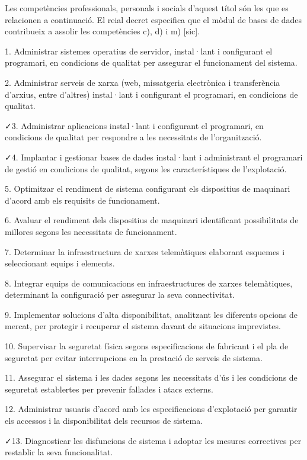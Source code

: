 \documentclass[catalan, a4paper, 12pt, titlepage]{article}
\begin{document}
Les competències professionals, personals i socials d'aquest títol són les que es relacionen a continuació. 
El reial decret especifica que el mòdul de bases de dades contribueix a assolir les competències c), d) i m) [sic].

1. Administrar sistemes operatius de servidor, instal·lant i configurant el programari, en condicions de qualitat per assegurar el funcionament del sistema.

2. Administrar serveis de xarxa (web, missatgeria electrònica i transferència d'arxius, entre d'altres) instal·lant i configurant el programari, en condicions de qualitat.

\faCheck 3. Administrar aplicacions instal·lant i configurant el programari, en condicions de qualitat per respondre a les necessitats de l'organització.

\faCheck 4. Implantar i gestionar bases de dades instal·lant i administrant el programari de gestió en condicions de qualitat, segons les característiques de l'explotació.

5. Optimitzar el rendiment de sistema configurant els dispositius de maquinari d'acord amb els requisits de funcionament.

6. Avaluar el rendiment dels dispositius de maquinari identificant possibilitats de millores segons les necessitats de funcionament.

7. Determinar la infraestructura de xarxes telemàtiques elaborant esquemes i seleccionant equips i elements.

8. Integrar equips de comunicacions en infraestructures de xarxes telemàtiques, determinant la configuració per assegurar la seva connectivitat.

9. Implementar solucions d'alta disponibilitat, analitzant les diferents opcions de mercat, per protegir i recuperar el sistema davant de situacions imprevistes.

10. Supervisar la seguretat física segons especificacions de fabricant i el pla de seguretat per evitar interrupcions en la prestació de serveis de sistema.

11. Assegurar el sistema i les dades segons les necessitats d'ús i les condicions de seguretat establertes per prevenir fallades i atacs externs.

12. Administrar usuaris d'acord amb les especificacions d'explotació per garantir els accessos i la disponibilitat dels recursos de sistema.

\faCheck 13. Diagnosticar les disfuncions de sistema i adoptar les mesures correctives per restablir la seva funcionalitat.
\end{document}
